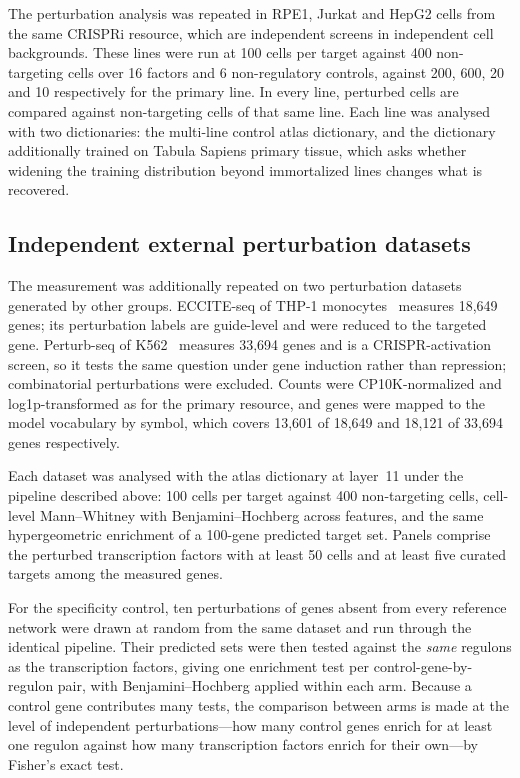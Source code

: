 \documentclass[onecolumn,11pt]{article}
\begin{document}
The perturbation analysis was repeated in RPE1, Jurkat and HepG2 cells from the same CRISPRi
resource, which are independent screens in independent cell backgrounds. These lines were run at
100 cells per target against 400 non-targeting cells over 16 factors and 6 non-regulatory controls,
against 200, 600, 20 and 10 respectively for the primary line. In
every line, perturbed cells are compared against non-targeting cells of that same line. Each line
was analysed with two dictionaries: the multi-line control atlas dictionary, and the dictionary
additionally trained on Tabula Sapiens primary tissue, which asks whether widening the training
distribution beyond immortalized lines changes what is recovered.

\subsection*{Independent external perturbation datasets}

The measurement was additionally repeated on two perturbation datasets generated by other groups.
ECCITE-seq of THP-1 monocytes~\cite{papalexi2021eccite} measures 18,649 genes; its perturbation
labels are guide-level and were reduced to the targeted gene. Perturb-seq of
K562~\cite{norman2019exploring} measures 33,694 genes and is a CRISPR-activation screen, so it
tests the same question under gene induction rather than repression; combinatorial perturbations
were excluded. Counts were CP10K-normalized and log1p-transformed as for the primary resource, and
genes were mapped to the model vocabulary by symbol, which covers 13,601 of 18,649 and 18,121 of
33,694 genes respectively.

Each dataset was analysed with the atlas dictionary at layer~11 under the pipeline described above:
100 cells per target against 400 non-targeting cells, cell-level Mann--Whitney with
Benjamini--Hochberg across features, and the same hypergeometric enrichment of a 100-gene predicted
target set. Panels comprise the perturbed transcription factors with at least 50 cells and at least
five curated targets among the measured genes.

For the specificity control, ten perturbations of genes absent from every reference network were
drawn at random from the same dataset and run through the identical pipeline. Their predicted sets
were then tested against the \emph{same} regulons as the transcription factors, giving one
enrichment test per control-gene-by-regulon pair, with Benjamini--Hochberg applied within each arm.
Because a control gene contributes many tests, the comparison between arms is made at the level of
independent perturbations---how many control genes enrich for at least one regulon against how many
transcription factors enrich for their own---by Fisher's exact test.
\end{document}
